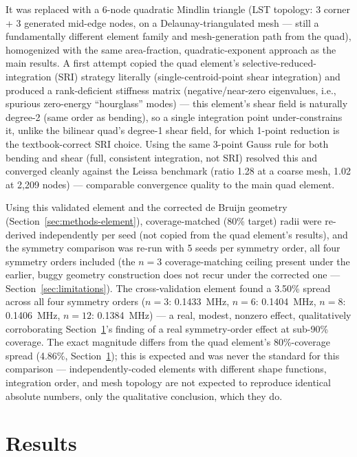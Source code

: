 \documentclass[11pt]{article}
\begin{document}
It was replaced with a 6-node quadratic Mindlin triangle (LST topology: 3 corner + 3 generated mid-edge nodes, on a Delaunay-triangulated mesh --- still a fundamentally different element family and mesh-generation path from the quad), homogenized with the same area-fraction, quadratic-exponent approach as the main results. A first attempt copied the quad element's selective-reduced-integration (SRI) strategy literally (single-centroid-point shear integration) and produced a rank-deficient stiffness matrix (negative/near-zero eigenvalues, i.e., spurious zero-energy ``hourglass'' modes) --- this element's shear field is naturally degree-2 (same order as bending), so a single integration point under-constrains it, unlike the bilinear quad's degree-1 shear field, for which 1-point reduction is the textbook-correct SRI choice. Using the same 3-point Gauss rule for both bending and shear (full, consistent integration, not SRI) resolved this and converged cleanly against the Leissa benchmark (ratio 1.28 at a coarse mesh, 1.02 at 2{,}209 nodes) --- comparable convergence quality to the main quad element.

Using this validated element and the corrected de Bruijn geometry (Section~\ref{sec:methods-element}), coverage-matched (80\% target) radii were re-derived independently per seed (not copied from the quad element's results), and the symmetry comparison was re-run with 5 seeds per symmetry order, all four symmetry orders included (the $n=3$ coverage-matching ceiling present under the earlier, buggy geometry construction does not recur under the corrected one --- Section~\ref{sec:limitations}). The cross-validation element found a 3.50\% spread across all four symmetry orders ($n=3$: 0.1433~MHz, $n=6$: 0.1404~MHz, $n=8$: 0.1406~MHz, $n=12$: 0.1384~MHz) --- a real, modest, nonzero effect, qualitatively corroborating Section~\ref{sec:results}'s finding of a real symmetry-order effect at sub-90\% coverage. The exact magnitude differs from the quad element's 80\%-coverage spread (4.86\%, Section~\ref{sec:results}); this is expected and was never the standard for this comparison --- independently-coded elements with different shape functions, integration order, and mesh topology are not expected to reproduce identical absolute numbers, only the qualitative conclusion, which they do.

\section{Results}
\label{sec:results}
\end{document}
